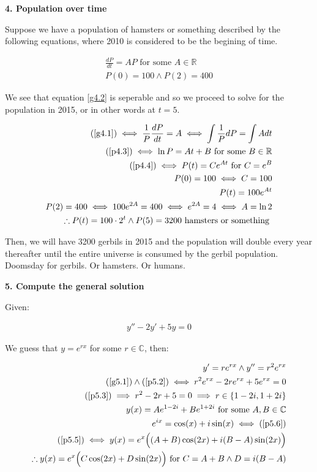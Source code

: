 \documentclass[12pt]{article}
\newcommand{\reals}{\mathbb{R}}
\newcommand{\cplx}{\mathbb{C}}
\begin{document}
\medskip

\textbf{4. Population over time}

Suppose we have a population of hamsters or something described by the following equations,
where 2010 is considered to be the begining of time.

\begin{align}
	\label{g4.1}
	\frac{dP}{dt} = AP \textrm{ for some } A \in \reals \\
	\label{g4.2}
	P(0) = 100 \land P(2) = 400
\end{align}

We see that equation \ref{g4.2} is seperable
and so we proceed to solve for the population in 2015,
or in other words at $t = 5$.

\begin{align}
	\label{p4.3}
	(\ref{g4.1}) \iff \frac{1}{P} \frac{dP}{dt} = A \iff \int \frac{1}{P} dP = \int A dt \\
	\label{p4.4}
	(\ref{p4.3}) \iff \ln P = At + B \textrm{ for some } B \in \reals \\
	(\ref{p4.4}) \iff P(t) = Ce^{At} \textrm{ for } C = e^B \\
	P(0) = 100 \iff C = 100 \\
	P(t) = 100e^{At} \\
	P(2) = 400 \iff 100e^{2A} = 400 \iff e^{2A} = 4 \iff A = \ln 2 \\
	\therefore P(t) = 100 \cdot 2^t \land P(5) = 3200 \textrm{ hamsters or something }
\end{align}

Then, we will have 3200 gerbils in 2015 and the population will double every year thereafter
until the entire universe is consumed by the gerbil population.
Doomsday for gerbils. Or hamsters. Or humans.

\pagebreak

\textbf{5. Compute the general solution}

Given:

\begin{align}
	\label{g5.1}
	y'' - 2y' + 5y = 0
\end{align}

We guess that $y = e^{rx}$ for some $r \in \cplx$, then:

\begin{align}
	\label{p5.2}
	y' = re^{rx} \land y'' = r^2e^{rx} \\
	\label{p5.3}
	(\ref{g5.1}) \land (\ref{p5.2}) \iff r^2e^{rx} - 2re^{rx} + 5e^{rx} = 0 \\
	\label{p5.4}
	(\ref{p5.3}) \implies r^2 - 2r + 5 = 0 \implies r \in \{ 1-2i, 1+2i \} \\
	y(x) = Ae^{1-2i} + Be^{1+2i} \textrm{ for some } A,B \in \cplx \\
	\label{p5.5}
	e^{ix} = \cos(x) + i \sin(x) \iff (\ref{p5.6}) \\
	\label{p5.6}
	(\ref{p5.5}) \iff y(x) = e^x\Big((A+B)\cos(2x) + i(B-A)\sin(2x)\Big) \\
	\therefore y(x) = e^x\Big(C\cos(2x) + D\sin(2x)\Big) \textrm{ for } C = A + B \land D = i(B-A)
\end{align}
\end{document}
